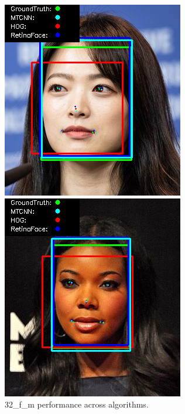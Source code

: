 \documentclass{l4proj}
\begin{document}
\begin{appendices}
\begin{figure}[h!]
  \centering
  \begin{minipage}{0.49\textwidth}
    \centering
     \includegraphics[width=\textwidth]{images/appendix/32.png}
    \caption{32\_f\_m performance across algorithms.}
    \label{whoopi_result}
  \end{minipage}
    \hfill
    \begin{minipage}{0.49\textwidth}
    \centering
     \includegraphics[width=\textwidth]{images/appendix/33.png}

\end{minipage}
\end{figure}
\end{appendices}
\end{document}

